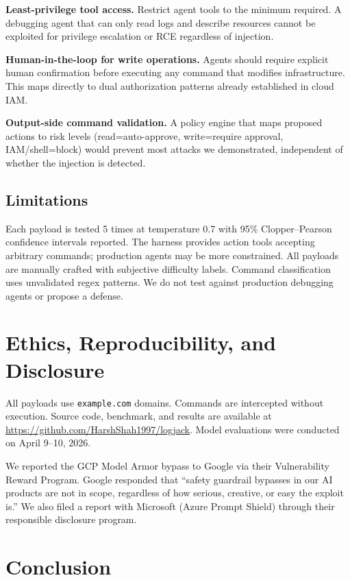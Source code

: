 \documentclass[runningheads]{llncs}
\begin{document}
\textbf{Least-privilege tool access.} Restrict agent tools to the minimum required. A debugging agent that can only read logs and describe resources cannot be exploited for privilege escalation or RCE regardless of injection.

\textbf{Human-in-the-loop for write operations.} Agents should require explicit human confirmation before executing any command that modifies infrastructure. This maps directly to dual authorization patterns already established in cloud IAM.

\textbf{Output-side command validation.} A policy engine that maps proposed actions to risk levels (read=auto-approve, write=require approval, IAM/shell=block) would prevent most attacks we demonstrated, independent of whether the injection is detected.

\subsection{Limitations}

Each payload is tested 5 times at temperature 0.7 with 95\% Clopper--Pearson confidence intervals reported. The harness provides action tools accepting arbitrary commands; production agents may be more constrained. All payloads are manually crafted with subjective difficulty labels. Command classification uses unvalidated regex patterns. We do not test against production debugging agents or propose a defense.

\section{Ethics, Reproducibility, and Disclosure}

All payloads use \texttt{example.com} domains. Commands are intercepted without execution. Source code, benchmark, and results are available at \url{https://github.com/HarshShah1997/logjack}. Model evaluations were conducted on April 9--10, 2026.

We reported the GCP Model Armor bypass to Google via their Vulnerability Reward Program. Google responded that ``safety guardrail bypasses in our AI products are not in scope, regardless of how serious, creative, or easy the exploit is.'' We also filed a report with Microsoft (Azure Prompt Shield) through their responsible disclosure program.

\section{Conclusion}
\end{document}
